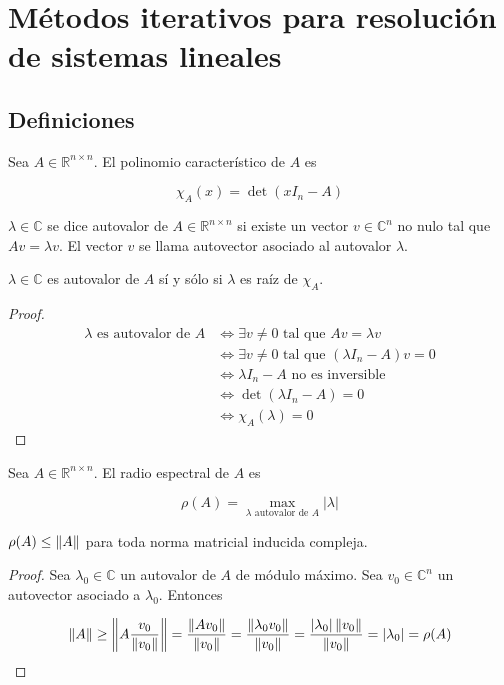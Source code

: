 \section{Métodos iterativos para resolución de sistemas lineales}

\subsection{Definiciones}

\begin{defi}
Sea $A \in \mathbb{R}^{n \times n}$. El polinomio característico de $A$ es

\[\chi_A(x) = \det(xI_n - A)\]
\end{defi}

\begin{defi}
$\lambda \in \mathbb{C}$ se dice autovalor de $A \in \mathbb{R}^{n \times n}$ si existe un vector $v \in \mathbb{C}^{n}$ no nulo tal que $Av = \lambda v$. El vector $v$ se llama autovector asociado al autovalor $\lambda$.
\end{defi}

\begin{propo}
$\lambda \in \mathbb{C}$ es autovalor de $A$ sí y sólo si $\lambda$ es raíz de $\chi_A$.
\begin{proof}
\begin{align*}
\lambda \text{ es autovalor de }A & \Leftrightarrow \exists v \neq 0 \text{ tal que } Av = \lambda v\\
& \Leftrightarrow \exists v \neq 0 \text{ tal que } (\lambda I_{n} - A)v = 0\\
& \Leftrightarrow \lambda I_{n} - A \text{ no es inversible}\\
& \Leftrightarrow \det(\lambda I_{n} - A) = 0\\
& \Leftrightarrow \chi_A(\lambda) = 0
\end{align*} 
\end{proof}
\end{propo}

\begin{defi}
Sea $A \in \mathbb{R}^{n \times n}$. El radio espectral de $A$ es

\[\rho(A) = \max\limits_{\lambda \text{ autovalor de }A} |\lambda|\]
\end{defi}

\begin{propo}
$\rho(A) \leq \left\lVert A\right\rVert$ para toda norma matricial inducida compleja.

\begin{proof}
Sea $\lambda_0 \in \mathbb{C}$ un autovalor de $A$ de módulo máximo. Sea $v_0 \in \mathbb{C}^n$ un autovector asociado a $\lambda_0$. Entonces

\[\left\lVert A\right\rVert \geq \left\lVert A \frac{v_0}{\left\lVert v_0\right\rVert}\right\rVert = \frac{\left\lVert Av_0\right\rVert}{\left\lVert v_0\right\rVert}  = \frac{\left\lVert\lambda_0 v_0\right\rVert}{\left\lVert v_0\right\rVert} = \frac{|\lambda_0| \left\lVert v_0\right\rVert}{\left\lVert v_0\right\rVert} = |\lambda_0| = \rho(A) \]
\end{proof}
\end{propo}

